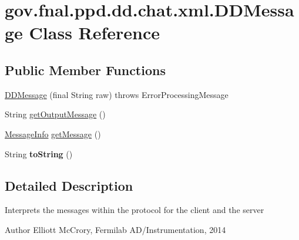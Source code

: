 \hypertarget{classgov_1_1fnal_1_1ppd_1_1dd_1_1chat_1_1xml_1_1DDMessage}{\section{gov.\-fnal.\-ppd.\-dd.\-chat.\-xml.\-D\-D\-Message Class Reference}
\label{classgov_1_1fnal_1_1ppd_1_1dd_1_1chat_1_1xml_1_1DDMessage}
}
\subsection*{Public Member Functions}
\begin{DoxyCompactItemize}
\item 
\hyperlink{classgov_1_1fnal_1_1ppd_1_1dd_1_1chat_1_1xml_1_1DDMessage_aeb9b1a320f5cff95348438efd3d7edf7}{D\-D\-Message} (final String raw)  throws Error\-Processing\-Message 
\item 
String \hyperlink{classgov_1_1fnal_1_1ppd_1_1dd_1_1chat_1_1xml_1_1DDMessage_accd4164d998a9b1e7eb7960c41a38542}{get\-Output\-Message} ()
\item 
\hyperlink{interfacegov_1_1fnal_1_1ppd_1_1dd_1_1chat_1_1xml_1_1MessageInfo}{Message\-Info} \hyperlink{classgov_1_1fnal_1_1ppd_1_1dd_1_1chat_1_1xml_1_1DDMessage_af40a148e563401baa6e70d117e1a8033}{get\-Message} ()
\item 
\hypertarget{classgov_1_1fnal_1_1ppd_1_1dd_1_1chat_1_1xml_1_1DDMessage_ae29e9279135b8e3f171a5698bbbc6f97}{String {\bfseries to\-String} ()}\label{classgov_1_1fnal_1_1ppd_1_1dd_1_1chat_1_1xml_1_1DDMessage_ae29e9279135b8e3f171a5698bbbc6f97}

\end{DoxyCompactItemize}


\subsection{Detailed Description}
Interprets the messages within the protocol for the client and the server

\begin{DoxyAuthor}{Author}
Elliott Mc\-Crory, Fermilab A\-D/\-Instrumentation, 2014 
\end{DoxyAuthor}


